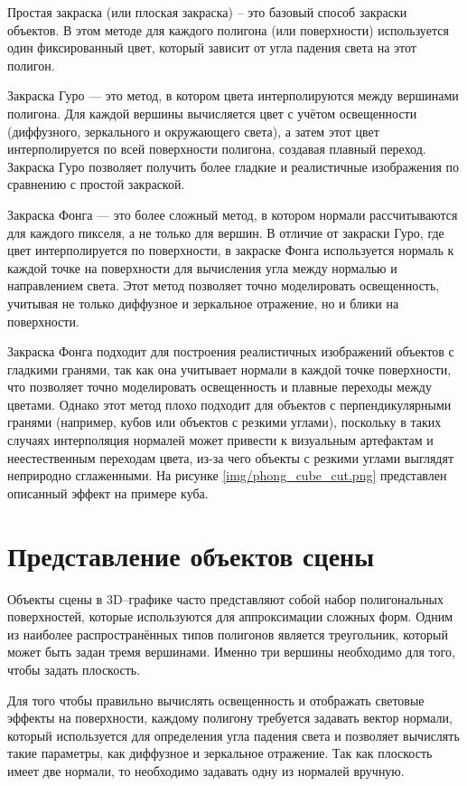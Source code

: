 Простая закраска (или плоская закраска) -- это базовый способ закраски объектов. В этом методе для каждого полигона (или поверхности) используется один фиксированный цвет, который зависит от угла падения света на этот полигон.

Закраска Гуро --- это метод, в котором цвета интерполируются между вершинами полигона. Для каждой вершины вычисляется цвет с учётом освещенности (диффузного, зеркального и окружающего света), а затем этот цвет интерполируется по всей поверхности полигона, создавая плавный переход. Закраска Гуро позволяет получить более гладкие и реалистичные изображения по сравнению с простой закраской.

Закраска Фонга --- это более сложный метод, в котором нормали рассчитываются для каждого пикселя, а не только для вершин. В отличие от закраски Гуро, где цвет интерполируется по поверхности, в закраске Фонга используется нормаль к каждой точке на поверхности для вычисления угла между нормалью и направлением света. Этот метод позволяет точно моделировать освещенность, учитывая не только диффузное и зеркальное отражение, но и блики на поверхности.

Закраска Фонга подходит для построения реалистичных изображений объектов с гладкими гранями, так как она учитывает нормали в каждой точке поверхности, что позволяет точно моделировать освещенность и плавные переходы между цветами. Однако этот метод плохо подходит для объектов с перпендикулярными гранями (например, кубов или объектов с резкими углами), поскольку в таких случаях интерполяция нормалей может привести к визуальным артефактам и неестественным переходам цвета, из-за чего объекты с резкими углами выглядят неприродно сглаженными. На рисунке \ref{img/phong_cube_cut.png} представлен описанный эффект на примере куба.


\section{Представление объектов сцены}
Объекты сцены в 3D--графике часто представляют собой набор полигональных поверхностей, которые используются для аппроксимации сложных форм. Одним из наиболее распространённых типов полигонов является треугольник, который может быть задан тремя вершинами. Именно три вершины необходимо для того, чтобы задать плоскость.

Для того чтобы правильно вычислять освещенность и отображать световые эффекты на поверхности, каждому полигону требуется задавать вектор нормали, который используется для определения угла падения света и позволяет вычислять такие параметры, как диффузное и зеркальное отражение. Так как плоскость имеет две нормали, то необходимо задавать одну из нормалей вручную. 

